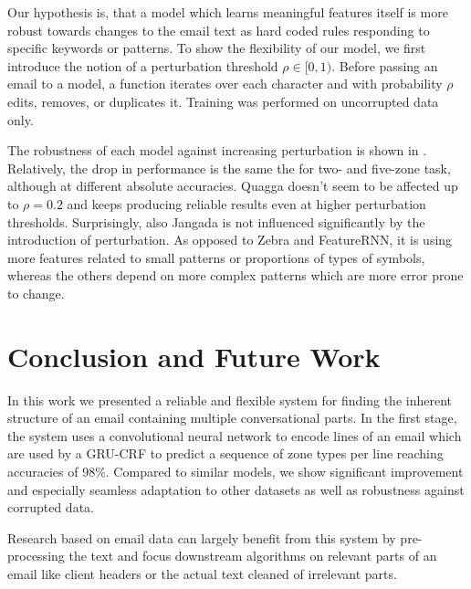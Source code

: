 \documentclass{llncs}
\begin{document}
Our hypothesis is, that a model which learns meaningful features itself is more robust towards changes to the email text as hard coded rules responding to specific keywords or patterns.
To show the flexibility of our model, we first introduce the notion of a perturbation threshold $\rho\in[0,1)$.
Before passing an email to a model, a function iterates over each character and with probability $\rho$ edits, removes, or duplicates it.
Training was performed on uncorrupted data only.

The robustness of each model against increasing perturbation is shown in .
Relatively, the drop in performance is the same the for two- and five-zone task, although at different absolute accuracies.
Quagga doesn't seem to be affected up to $\rho=0.2$ and keeps producing reliable results even at higher perturbation thresholds.
Surprisingly, also Jangada is not influenced significantly by the introduction of perturbation.
As opposed to Zebra and FeatureRNN, it is using more features related to small patterns or proportions of types of symbols, whereas the others depend on more complex patterns which are more error prone to change.

\section{Conclusion and Future Work}
In this work we presented a reliable and flexible system for finding the inherent structure of an email containing multiple conversational parts.
In the first stage, the system uses a convolutional neural network to encode lines of an email which are used by a GRU-CRF to predict a sequence of zone types per line reaching accuracies of 98\%.
Compared to similar models, we show significant improvement and especially seamless adaptation to other datasets as well as robustness against corrupted data.

Research based on email data can largely benefit from this system by pre-processing the text and focus downstream algorithms on relevant parts of an email like client headers or the actual text cleaned of irrelevant parts.

\end{document}

